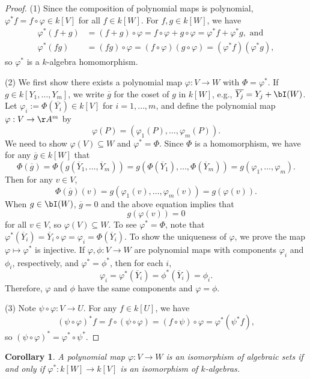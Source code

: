 \documentclass[12pt]{amsart}
\theoremstyle{plain}
\newtheorem{corollary}[theorem]{Corollary}
\begin{document}
\begin{proof}
(1) Since the composition of polynomial maps is polynomial, $\varphi^* f = f \circ \varphi \in k[V]$ for all $f \in k[W]$.
For $f, g \in k[W]$, we have
\begin{align*}
	\varphi^*(f + g) &= (f+g)\circ\varphi = f\circ\varphi + g\circ\varphi = \varphi^*f + \varphi^*g, \text{ and } \\
	\varphi^*(fg) &= (fg)\circ\varphi = (f\circ\varphi)(g\circ\varphi) = (\varphi^* f)(\varphi^* g),
\end{align*}
so $\varphi^*$ is a $k$-algebra homomorphism.

(2) We first show there exists a polynomial map $\varphi : V \to W$ with $\Phi = \varphi^*$.
If $g \in k[Y_1, \ldots, Y_m]$, we write $\overline{g}$ for the coset of $g$ in $k[W]$, e.g., $\overline{Y_j} = Y_j + \bI(W)$.
Let $\varphi_i := \Phi(\overline{Y_i}) \in k[V]$ for $i=1,\ldots,m$, and define the polynomial map $\varphi:V \to \AA^m$ by
$$\varphi(P) = (\varphi_1(P), \ldots, \varphi_m(P)).$$
We need to show $\varphi(V) \subseteq W$ and $\varphi^* = \Phi$.
Since $\Phi$ is a homomorphism, we have for any $\overline{g} \in k[W]$ that
$$\Phi(\overline{g}) =\Phi(g(\overline{Y}_1, \ldots, \overline{Y}_m)) = g(\Phi(\overline{Y}_1), \ldots, \Phi(\overline{Y}_m)) = g(\varphi_1, \ldots, \varphi_m).$$
Then for any $v \in V$,
$$\Phi(\overline{g})(v) = g(\varphi_1(v), \ldots, \varphi_m(v)) = g(\varphi(v)).$$
When $g \in \bI(W)$, $\overline{g} = 0$ and the above equation implies that
$$g(\varphi(v)) = 0$$
for all $v \in V$, so $\varphi(V) \subseteq W$.
To see $\varphi^* = \Phi$, note that $\varphi^*(\overline{Y}_i) = \overline{Y}_i \circ \varphi = \varphi_i = \Phi(\overline{Y}_i).$
To show the uniqueness of $\varphi$, we prove the map $\varphi \mapsto \varphi^*$ is injective.
If $\varphi, \phi:V \to W$ are polynomial maps with components $\varphi_i$ and $\phi_i$, respectively, and $\varphi^*=\phi^*$, then for each $i$, 
$$\varphi_i = \varphi^*(\overline{Y}_i) = \phi^*(\overline{Y}_i) = \phi_i.$$
Therefore, $\varphi$ and $\phi$ have the same components and $\varphi=\phi$.

(3) Note $\psi \circ \varphi:V \to U$.
For any $f \in k[U]$, we have
$$(\psi \circ \varphi)^* f = f \circ (\psi \circ \varphi) = (f \circ \psi) \circ \varphi = \varphi^*(\psi^* f),$$
so $(\psi \circ \varphi)^* = \varphi^* \circ \psi^*$.
\end{proof}

\begin{corollary}\label{isoofalgsetscoro}
A polynomial map $\varphi:V \to W$ is an isomorphism of algebraic sets if and only if $\varphi^*:k[W]\to k[V]$ is an isomorphism of $k$-algebras.
\end{corollary}
\end{document}
